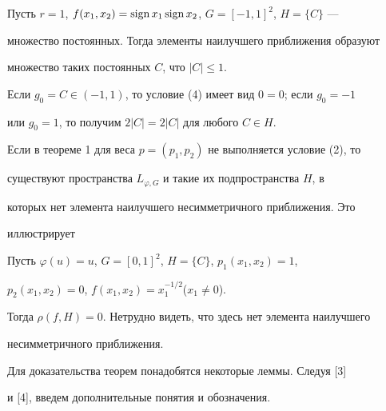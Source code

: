 \begin{exam} 


Пусть $r=1$, $f(x_1,x_2)=\operatorname{sign} x_1\operatorname{sign} x_2$, $G=[-1,1]^2$, $H=\{C\}$ --- 


множество постоянных. Тогда элементы наилучшего приближения образуют 


множество таких постоянных $C$, что $|C|\le1$. 


 


Если $g_0=C\in(-1,1)$, то условие (4) имеет вид $0=0$; если $g_0=-1$ 


или $g_0=1$, то получим $2|C|=2|C|$ для любого $C\in H$. 


\end{exam} 


 


 


\begin{note} 


Если в теореме 1 для веса $p=(p_1,p_2)$ не выполняется условие (2), то 


существуют пространства $L_{\varphi,G}$ и такие их подпространства $H$, в 


которых нет элемента наилучшего несимметричного приближения. Это 


иллюстрирует 


\end{note} 


 


 


\begin{exam} 


Пусть $\varphi(u){=}u$, $G{=}[0,1]^2$, $H{=}\{C\}$, $p_1(x_1,x_2){=}1$, 


$p_2(x_1,x_2){=}0$, $f(x_1,x_2){=}x_1^{-1/2}$\linebreak ($x_1\ne0$). 


 


Тогда $\rho(f,H)=0$. Нетрудно видеть, что здесь нет элемента наилучшего 


несимметричного приближения. 


\end{exam} 


 


Для доказательства теорем понадобятся некоторые леммы. Следуя [3] 


и [4], введем дополнительные понятия и обозначения. 


